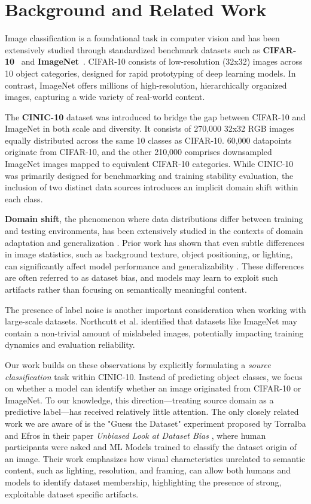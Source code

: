 \section{Background and Related Work}

Image classification is a foundational task in computer vision and has been extensively studied through standardized benchmark datasets such as \textbf{CIFAR-10}~\cite{krizhevsky2009learning} 
and \textbf{ImageNet}~\cite{deng2009imagenet}. CIFAR-10 consists of low-resolution (32x32) images across 10 object categories, 
designed for rapid prototyping of deep learning models. In contrast, ImageNet offers millions of high-resolution, hierarchically organized images, capturing a wide variety of real-world content.

The \textbf{CINIC-10} dataset \cite{darlow2018cinic} was introduced to bridge the gap between CIFAR-10 and ImageNet in both scale and diversity. It consists of 
270,000 32x32 RGB images equally distributed across the same 10 classes as CIFAR-10. 60,000 datapoints originate from CIFAR-10, and the other 210,000 comprises downsampled ImageNet 
images mapped to equivalent CIFAR-10 categories. While CINIC-10 was primarily designed for benchmarking and training stability evaluation, the inclusion of two distinct data sources 
introduces an implicit domain shift within each class.

\textbf{Domain shift}, the phenomenon where data distributions differ between training and testing environments, has been extensively studied in the contexts of domain adaptation and 
generalization \cite{wang2018deep}. Prior work has shown that even subtle differences in image statistics, such as background texture, object positioning, or lighting, can significantly 
affect model performance and generalizability \cite{torralba2011unbiased, recht2019imagenet}. These differences are often referred to as dataset bias, and models may learn to exploit such 
artifacts rather than focusing on semantically meaningful content.

The presence of label noise is another important consideration when working with large-scale datasets. Northcutt et al. \cite{northcutt2021confident} identified that datasets like ImageNet 
may contain a non-trivial amount of mislabeled images, potentially impacting training dynamics and evaluation reliability.

Our work builds on these observations by explicitly formulating a \textit{source classification} task within CINIC-10. Instead of predicting object classes, we focus on whether a model
can identify whether an image originated from CIFAR-10 or ImageNet. To our knowledge, this direction—treating source domain as a predictive label—has received relatively little attention. 
The only closely related work we are aware of is the "Guess the Dataset" experiment proposed by Torralba and Efros in their paper \textit{Unbiased Look at Dataset Bias} 
\cite{torralba2011unbiased}, where human participants were asked and ML Models trained to classify the dataset origin of an image. 
Their work emphasizes how visual characteristics unrelated to semantic content, such as lighting, resolution, and framing, can allow both humans and models to identify dataset membership, 
highlighting the presence of strong, exploitable dataset specific artifacts.
